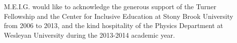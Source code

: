 M.E.I.G. would like to acknowledge the generous support of the Turner Fellowship and the Center for Inclusive Education at Stony Brook University from 2006 to 2013, and the kind hospitality of the Physics Department at Wesleyan University during the 2013-2014 academic year.